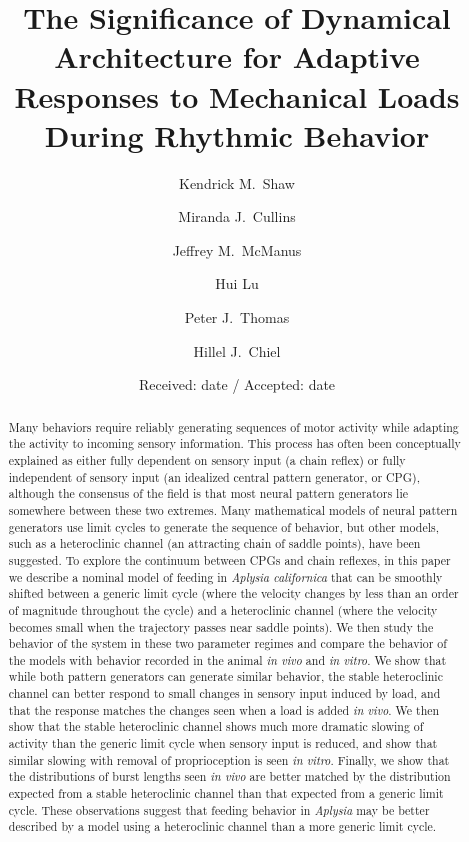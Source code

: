 \documentclass[twocolumn]{svjour3}       %
\title{The Significance of Dynamical Architecture for Adaptive Responses to Mechanical Loads During Rhythmic Behavior}
\author{
    Kendrick M.~Shaw \and Miranda J.~Cullins \and Jeffrey M.~McManus \and Hui Lu \and Peter J.~Thomas \and Hillel J.~Chiel}
\institute{
    Kendrick M.~Shaw \at
    Department of Biology and Medical Scientist Training Program, Case Western Reserve University, 10900 Euclid Ave., Cleveland OH 44106, USA \\
    \email{kendrick.shaw@case.edu}           %
    \and
    Miranda J.~Cullins $\cdot$ Jeffrey M.~McManus $\cdot$ Hui Lu \at
    Department of Biology, Case Western Reserve University, 10900 Euclid Ave., Cleveland OH 44106, USA
    \and
    Peter J.~Thomas \at
    Departments of Mathematics, Biology and Cognitive Science, Case Western Reserve University, 10900 Euclid Ave., Cleveland OH 44106, USA \\
    \email{peter.j.thomas@case.edu}           %
    \and
    Hillel J.~Chiel \at
    Departments of Biology, Neurosciences and Biomedical Engineering, Case Western Reserve University, 10900 Euclid Ave., Cleveland OH 44106, USA \\
    \email{hjc@case.edu}           %
}
\date{Received: date / Accepted: date}
\begin{document}
\listoftodos
\maketitle

\begin{abstract}
Many behaviors require reliably generating sequences of motor activity while
adapting the activity to incoming sensory information.  This process has often
been conceptually explained as either fully dependent on sensory input (a
chain reflex) or fully independent of sensory input (an idealized central
pattern generator, or CPG), although the consensus of the field is that most neural
pattern generators lie somewhere between these two extremes.  Many mathematical
models of neural pattern generators use limit cycles to generate the sequence
of behavior, but other models, such as a heteroclinic channel (an attracting
chain of saddle points), have been
suggested.  To explore the continuum between CPGs and chain reflexes, in this
paper we describe a nominal model of feeding in
\textit{Aplysia californica} that can be smoothly shifted between a
generic limit cycle (where the velocity changes by less than an order of
magnitude throughout the cycle) and a heteroclinic channel (where the velocity
becomes small when the trajectory passes near saddle points).  We then study
the behavior of the system in these two parameter regimes and compare the
behavior of the models with behavior recorded in the animal \textit{in vivo}
and \textit{in vitro}.  We show that while both pattern generators can generate
similar behavior, the stable heteroclinic channel can better respond to
small changes in sensory input induced by load, and that the response matches
the changes seen when a load is added \textit{in vivo}.  We then show that
the stable heteroclinic channel shows much more dramatic slowing of activity
than the generic limit cycle when sensory input is reduced, and show that
similar slowing with removal of proprioception is seen \textit{in vitro}.
Finally, we show that the distributions of burst lengths seen \textit{in
vivo} are better matched by the distribution expected from a stable
heteroclinic channel than that expected from a generic limit cycle.
These observations suggest that feeding behavior in \textit{Aplysia} may be
better described by a model using a heteroclinic channel than a more generic
limit cycle.

\end{abstract}
\end{document}
